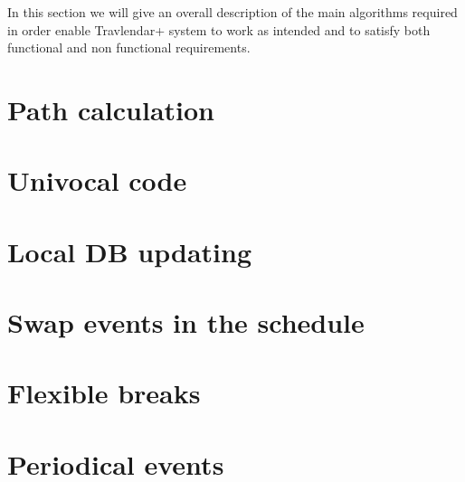 In this section we will give an overall description of the main algorithms required in order enable Travlendar+ system to work as intended and to satisfy both functional and non functional requirements.

\section{Path calculation}
\label{sect:Path calculation}
	

\section{Univocal code}
\label{sect: Univocal code}
	

\section{Local DB updating}
\label{sect: Local DB updating}
	

\section{Swap events in the schedule}
\label{sect: Swap events in the schedule}
	

\section{Flexible breaks}
\label{sect: Flexible breaks}
	

\section{Periodical events}
\label{sect: Periodical events}
	

